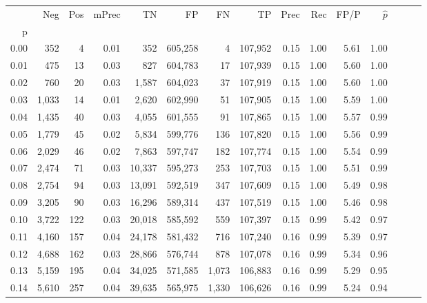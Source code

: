 \begin{tabular}{rrrrrrrrrrrrrrr}
\toprule
{} &     Neg &    Pos & mPrec &       TN &       FP &       FN &       TP &  Prec &   Rec &  FP/P & $\hat{p}$ \\
p    &         &        &       &          &          &          &          &       &       &       &           \\
\midrule
0.00 &     352 &      4 &  0.01 &      352 &  605,258 &        4 &  107,952 &  0.15 &  1.00 &  5.61 &      1.00 \\
0.01 &     475 &     13 &  0.03 &      827 &  604,783 &       17 &  107,939 &  0.15 &  1.00 &  5.60 &      1.00 \\
0.02 &     760 &     20 &  0.03 &    1,587 &  604,023 &       37 &  107,919 &  0.15 &  1.00 &  5.60 &      1.00 \\
0.03 &   1,033 &     14 &  0.01 &    2,620 &  602,990 &       51 &  107,905 &  0.15 &  1.00 &  5.59 &      1.00 \\
0.04 &   1,435 &     40 &  0.03 &    4,055 &  601,555 &       91 &  107,865 &  0.15 &  1.00 &  5.57 &      0.99 \\
0.05 &   1,779 &     45 &  0.02 &    5,834 &  599,776 &      136 &  107,820 &  0.15 &  1.00 &  5.56 &      0.99 \\
0.06 &   2,029 &     46 &  0.02 &    7,863 &  597,747 &      182 &  107,774 &  0.15 &  1.00 &  5.54 &      0.99 \\
0.07 &   2,474 &     71 &  0.03 &   10,337 &  595,273 &      253 &  107,703 &  0.15 &  1.00 &  5.51 &      0.99 \\
0.08 &   2,754 &     94 &  0.03 &   13,091 &  592,519 &      347 &  107,609 &  0.15 &  1.00 &  5.49 &      0.98 \\
0.09 &   3,205 &     90 &  0.03 &   16,296 &  589,314 &      437 &  107,519 &  0.15 &  1.00 &  5.46 &      0.98 \\
0.10 &   3,722 &    122 &  0.03 &   20,018 &  585,592 &      559 &  107,397 &  0.15 &  0.99 &  5.42 &      0.97 \\
0.11 &   4,160 &    157 &  0.04 &   24,178 &  581,432 &      716 &  107,240 &  0.16 &  0.99 &  5.39 &      0.97 \\
0.12 &   4,688 &    162 &  0.03 &   28,866 &  576,744 &      878 &  107,078 &  0.16 &  0.99 &  5.34 &      0.96 \\
0.13 &   5,159 &    195 &  0.04 &   34,025 &  571,585 &    1,073 &  106,883 &  0.16 &  0.99 &  5.29 &      0.95 \\
0.14 &   5,610 &    257 &  0.04 &   39,635 &  565,975 &    1,330 &  106,626 &  0.16 &  0.99 &  5.24 &      0.94 \\

\end{tabular}
